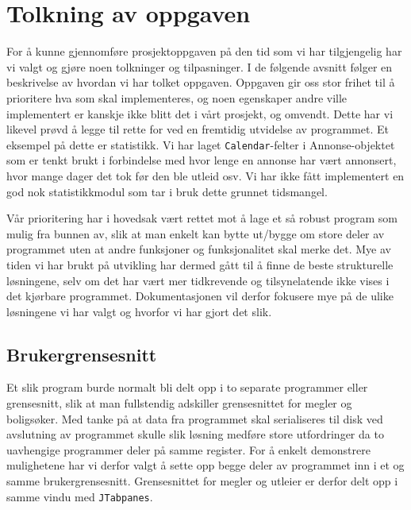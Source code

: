 \section{Tolkning av oppgaven}
For å kunne gjennomføre prosjektoppgaven på den tid som vi har tilgjengelig har vi valgt og gjøre noen tolkninger og tilpasninger. I de følgende avsnitt følger en beskrivelse av hvordan vi har tolket oppgaven.
Oppgaven gir oss stor frihet til å prioritere hva som skal implementeres, og noen egenskaper andre ville implementert er kanskje ikke blitt det i vårt prosjekt, og omvendt. Dette har vi likevel prøvd å legge til rette for ved en fremtidig utvidelse av programmet. 
Et eksempel på dette er statistikk. Vi har laget \texttt{Calendar}-felter i Annonse-objektet som er tenkt brukt i forbindelse med hvor lenge en annonse har vært annonsert, hvor mange dager det tok før den ble utleid osv. Vi har ikke fått implementert en god nok statistikkmodul som tar i bruk dette grunnet tidsmangel.

Vår prioritering har i hovedsak vært rettet mot å lage et så robust program som mulig fra bunnen av, slik at man enkelt kan bytte ut/bygge om store deler av programmet uten at andre funksjoner og funksjonalitet skal merke det.
Mye av tiden vi har brukt på utvikling har dermed gått til å finne de beste strukturelle løsningene, selv om det har vært mer tidkrevende og tilsynelatende ikke vises i det kjørbare programmet. 
Dokumentasjonen vil derfor fokusere mye på de ulike løsningene vi har valgt og hvorfor vi har gjort det slik.

\subsection{Brukergrensesnitt}
Et slik program burde normalt bli delt opp i to separate programmer eller grensesnitt, slik at man fullstendig adskiller grensesnittet for megler og boligsøker. Med tanke på at data fra programmet skal serialiseres til disk ved avslutning av programmet skulle slik løsning medføre store utfordringer da to uavhengige programmer deler på samme register. For å enkelt demonstrere mulighetene har vi derfor valgt å sette opp begge deler av programmet inn i et og samme brukergrensesnitt. Grensesnittet for megler og utleier er derfor delt opp i samme vindu med \texttt{JTabpanes}. 

